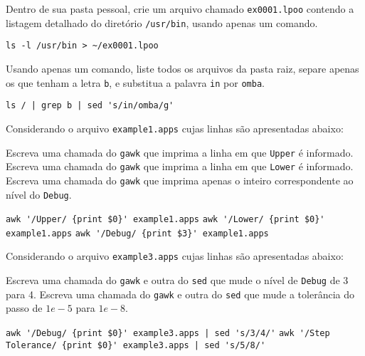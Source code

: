 \begin{Exercise}[label={0001},difficulty={0},origin={bash}]
  Dentro de sua pasta pessoal, crie um arquivo chamado \lstinline+ex0001.lpoo+
  contendo a listagem detalhado do diretório \lstinline+/usr/bin+, usando apenas um
  comando. 
\end{Exercise}
\begin{Answer}[ref={0001}]
\begin{lstlisting}
ls -l /usr/bin > ~/ex0001.lpoo
\end{lstlisting}
\end{Answer}

\begin{Exercise}[label={0002},difficulty={2},origin={bash}]
  Usando apenas um comando, liste todos os arquivos da pasta raiz, separe apenas
  os que tenham a letra \lstinline+b+, e substitua a palavra \lstinline+in+ por
  \lstinline+omba+.
\end{Exercise}
\begin{Answer}[ref={0002}]
\begin{lstlisting}
ls / | grep b | sed 's/in/omba/g'
\end{lstlisting}
\end{Answer}

\begin{Exercise}[label={0003}, difficulty={1}, origin={gawk}]
  Considerando o arquivo \lstinline+example1.apps+ cujas linhas são
  apresentadas abaixo:
  
    \Question Escreva uma chamada do \lstinline+gawk+ que imprima a linha em que
      \lstinline+Upper+ é informado.
    \Question Escreva uma chamada do \lstinline+gawk+ que imprima a linha em que
      \lstinline+Lower+ é informado.
    \Question Escreva uma chamada do \lstinline+gawk+ que imprima apenas o inteiro
      correspondente ao nível do \lstinline+Debug+.
\end{Exercise}
\begin{Answer}[ref={0003}]
  \Question \lstinline+awk '/Upper/ {print $0}' example1.apps+
  \Question \lstinline+awk '/Lower/ {print $0}' example1.apps+
  \Question \lstinline+awk '/Debug/ {print $3}' example1.apps+
\end{Answer}

\begin{Exercise}[label={0004}, difficulty={1}, origin={gawk}]
  Considerando o arquivo \lstinline+example3.apps+ cujas linhas são
  apresentadas abaixo:
  
    \Question Escreva uma chamada do \lstinline+gawk+ e outra do \lstinline+sed+ que
      mude o nível de \lstinline+Debug+ de 3 para 4.
    \Question Escreva uma chamada do \lstinline+gawk+ e outra do \lstinline+sed+ que
      mude a tolerância do passo de $1e-5$ para $1e-8$.
\end{Exercise}
\begin{Answer}[ref={0004}]
    \Question \lstinline+awk '/Debug/ {print $0}' example3.apps | sed 's/3/4/'+
    \Question \lstinline+awk '/Step Tolerance/ {print $0}' example3.apps | sed 's/5/8/'+
\end{Answer}

